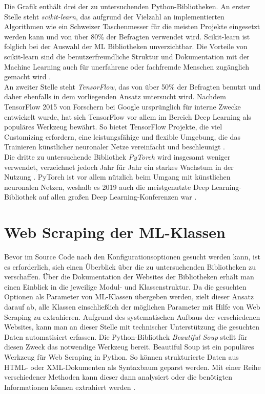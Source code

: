 \documentclass[german,bachelor]{swsLeipzig}
\begin{document}
\noindent Die Grafik enthält drei der zu untersuchenden Python-Bibliotheken.
An erster Stelle steht \textit{scikit-learn}, das aufgrund der Vielzahl an implementierten Algorithmen wie ein \glqq Schweizer Taschenmesser\grqq{}
für die meisten Projekte eingesetzt werden kann und von über 80\% der Befragten verwendet wird.
Scikit-learn ist folglich bei der Auswahl der ML Bibliotheken unverzichtbar.
Die Vorteile von scikit-learn sind die benutzerfreundliche Struktur und Dokumentation mit der Machine Learning
auch für unerfahrene oder fachfremde Menschen zugänglich gemacht wird \cite[]{10.1145/2786984.2786995}.\\
\indent An zweiter Stelle steht \textit{TensorFlow}, das von über 50\% der Befragten benutzt und daher ebenfalls in
dem vorliegenden Ansatz untersucht wird.
Nachdem TensorFlow 2015 von Forschern bei Google ursprünglich für interne Zwecke entwickelt wurde, hat sich TensorFlow vor allem im Bereich
Deep Learning als populäres Werkzeug bewährt.
So bietet TensorFlow Projekte, die viel Customizing erfordern, eine leistungsfähige und flexible Umgebung, die das Trainieren
künstlicher neuronaler Netze vereinfacht und beschleunigt \cite[]{doi:10.3102/1076998619872761}.\\
\indent Die dritte zu untersuchende Bibliothek \textit{PyTorch} wird insgesamt weniger verwendet, verzeichnet
jedoch Jahr für Jahr ein starkes Wachstum in der Nutzung \cite[]{kaggle}.
PyTorch ist vor allem nützlich beim Umgang mit künstlichen neuronalen Netzen, weshalb es 2019 auch die
meistgenutzte Deep Learning-Bibliothek auf allen großen Deep Learning-Konferenzen war \cite[]{2020}.\\

\section{Web Scraping der ML-Klassen}\label{scrape}
Bevor im Source Code nach den Konfigurationsoptionen gesucht werden kann, ist es erforderlich, sich einen Überblick über
die zu untersuchenden Bibliotheken zu verschaffen.
Über die Dokumentation der Websites der Bibliotheken erhält man einen Einblick in die jeweilige Modul- und Klassenstruktur.
Da die gesuchten Optionen als Parameter von ML-Klassen übergeben werden, zielt dieser Ansatz darauf ab, alle Klassen
einschließlich der möglichen Parameter mit Hilfe von Web Scraping zu extrahieren.
Aufgrund des systematischen Aufbaus der verschiedenen Websites, kann man an dieser Stelle mit technischer Unterstützung
die gesuchten Daten automatisiert erfassen.
Die Python-Bibliothek \textit{Beautiful Soup} stellt für diesen Zweck das notwendige Werkzeug bereit.
Beautiful Soup ist ein populäres Werkzeug für Web Scraping in Python.
So können strukturierte Daten aus HTML- oder XML-Dokumenten als Syntaxbaum geparst werden.
Mit einer Reihe verschiedener Methoden kann dieser dann analysiert oder die benötigten Informationen können
extrahiert werden \cite[]{richardson2007beautiful}.\\
\end{document}

